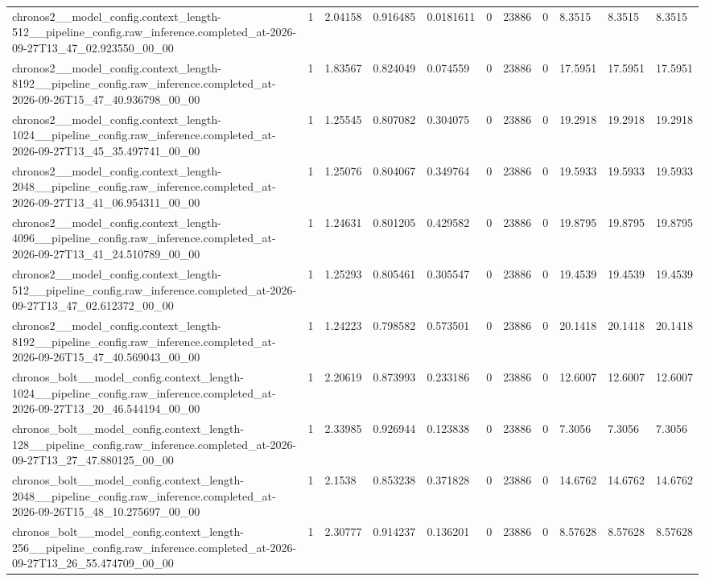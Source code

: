 \begin{tabular}{lllllllllll}
chronos2\_\_model\_config.context\_length-512\_\_pipeline\_config.raw\_inference.completed\_at-2026-09-27T13\_47\_02.923550\_00\_00 & 1 & 2.04158 & 0.916485 & 0.0181611 & 0 & 23886 & 0 & 8.3515 & 8.3515 & 8.3515 \\
chronos2\_\_model\_config.context\_length-8192\_\_pipeline\_config.raw\_inference.completed\_at-2026-09-26T15\_47\_40.936798\_00\_00 & 1 & 1.83567 & 0.824049 & 0.074559 & 0 & 23886 & 0 & 17.5951 & 17.5951 & 17.5951 \\
chronos2\_\_model\_config.context\_length-1024\_\_pipeline\_config.raw\_inference.completed\_at-2026-09-27T13\_45\_35.497741\_00\_00 & 1 & 1.25545 & 0.807082 & 0.304075 & 0 & 23886 & 0 & 19.2918 & 19.2918 & 19.2918 \\
chronos2\_\_model\_config.context\_length-2048\_\_pipeline\_config.raw\_inference.completed\_at-2026-09-27T13\_41\_06.954311\_00\_00 & 1 & 1.25076 & 0.804067 & 0.349764 & 0 & 23886 & 0 & 19.5933 & 19.5933 & 19.5933 \\
chronos2\_\_model\_config.context\_length-4096\_\_pipeline\_config.raw\_inference.completed\_at-2026-09-27T13\_41\_24.510789\_00\_00 & 1 & 1.24631 & 0.801205 & 0.429582 & 0 & 23886 & 0 & 19.8795 & 19.8795 & 19.8795 \\
chronos2\_\_model\_config.context\_length-512\_\_pipeline\_config.raw\_inference.completed\_at-2026-09-27T13\_47\_02.612372\_00\_00 & 1 & 1.25293 & 0.805461 & 0.305547 & 0 & 23886 & 0 & 19.4539 & 19.4539 & 19.4539 \\
chronos2\_\_model\_config.context\_length-8192\_\_pipeline\_config.raw\_inference.completed\_at-2026-09-26T15\_47\_40.569043\_00\_00 & 1 & 1.24223 & 0.798582 & 0.573501 & 0 & 23886 & 0 & 20.1418 & 20.1418 & 20.1418 \\
chronos\_bolt\_\_model\_config.context\_length-1024\_\_pipeline\_config.raw\_inference.completed\_at-2026-09-27T13\_20\_46.544194\_00\_00 & 1 & 2.20619 & 0.873993 & 0.233186 & 0 & 23886 & 0 & 12.6007 & 12.6007 & 12.6007 \\
chronos\_bolt\_\_model\_config.context\_length-128\_\_pipeline\_config.raw\_inference.completed\_at-2026-09-27T13\_27\_47.880125\_00\_00 & 1 & 2.33985 & 0.926944 & 0.123838 & 0 & 23886 & 0 & 7.3056 & 7.3056 & 7.3056 \\
chronos\_bolt\_\_model\_config.context\_length-2048\_\_pipeline\_config.raw\_inference.completed\_at-2026-09-26T15\_48\_10.275697\_00\_00 & 1 & 2.1538 & 0.853238 & 0.371828 & 0 & 23886 & 0 & 14.6762 & 14.6762 & 14.6762 \\
chronos\_bolt\_\_model\_config.context\_length-256\_\_pipeline\_config.raw\_inference.completed\_at-2026-09-27T13\_26\_55.474709\_00\_00 & 1 & 2.30777 & 0.914237 & 0.136201 & 0 & 23886 & 0 & 8.57628 & 8.57628 & 8.57628 \\

\end{tabular}
